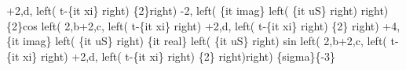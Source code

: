 \begin{maplegroup}
+2,d, left( t-\{it xi\} right) \{2\}right) -2, left( \{it imag\} left( \{it uS\} right)  right) \{2\}cos left( 2,b+2,c, left( t-\{it xi\} right) +2,d, left( t-\{it xi\} right) \{2\} right) +4,\{it imag\} left( \{it uS\} right) \{it real\} left( \{it uS\} right) sin left( 2,b+2,c, left( t-\{it xi\} right) +2,d, left( t-\{it xi\} right) \{2\} right)right) \{sigma\}\{-3\}\end{maplegroup}
